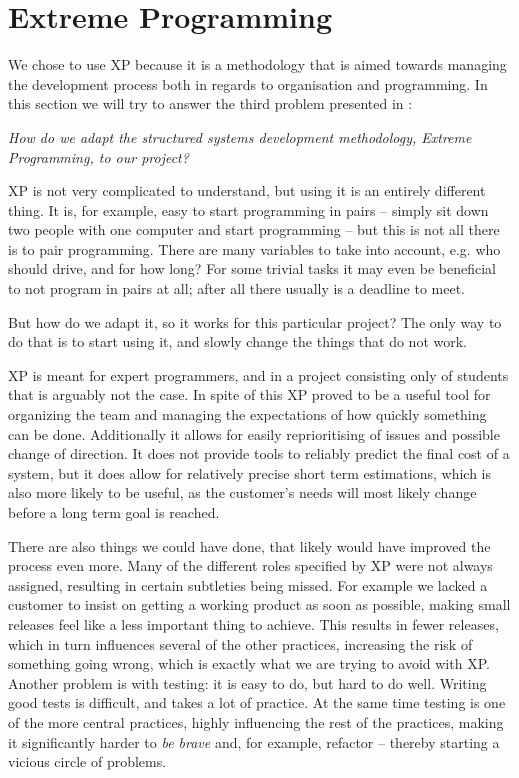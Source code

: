 \section{Extreme Programming}
We chose to use XP because it is a methodology that is aimed towards managing the development process both in regards to organisation and programming. In this section we will try to answer the third problem presented in :
\begin{center}
	\textit{How do we adapt the structured systems development methodology, Extreme Programming, to our project?}
\end{center}

\noindent XP is not very complicated to understand, but using it is an entirely different thing. It is, for example, easy to start programming in pairs -- simply sit down two people with one computer and start programming -- but this is not all there is to pair programming. There are many variables to take into account, e.g. who should drive, and for how long? For some trivial tasks it may even be beneficial to not program in pairs at all; after all there usually is a deadline to meet.

But how do we adapt it, so it works for this particular project? The only way to do that is to start using it, and slowly change the things that do not work.



XP is meant for expert programmers, and in a project consisting only of students that is arguably not the case. In spite of this XP proved to be a useful tool for organizing the team and managing the expectations of how quickly something can be done.  Additionally it allows for easily reprioritising of issues and possible change of direction. It does not provide tools to reliably predict the final cost of a system, but it does allow for relatively precise short term estimations, which is also more likely to be useful, as the customer's needs will most likely change before a long term goal is reached.

There are also things we could have done, that likely would have improved the process even more. Many of the different roles specified by XP were not always assigned, resulting in certain subtleties being missed. For example we lacked a customer to insist on getting a working product as soon as possible, making small releases feel like a less important thing to achieve. This results in fewer releases, which in turn influences several of the other practices, increasing the risk of something going wrong, which is exactly what we are trying to avoid with XP.
Another problem is with testing: it is easy to do, but hard to do well. Writing good tests is difficult, and takes a lot of practice. At the same time testing is one of the more central practices, highly influencing the rest of the practices, making it significantly harder to \textit{be brave} and, for example, refactor -- thereby starting a vicious circle of problems. 

